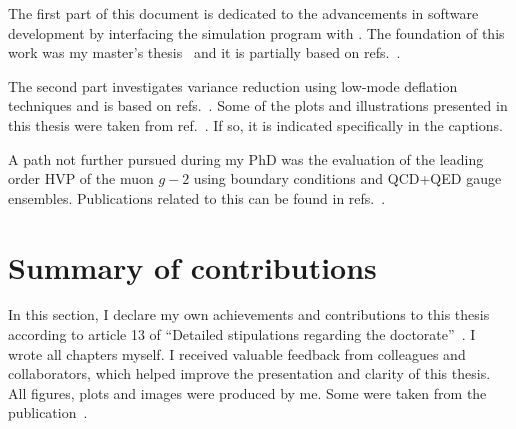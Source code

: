 The first part of this document is dedicated to the advancements in software development by interfacing the simulation program \openqxd with \quda.
The foundation of this work was my master's thesis~ and it is partially based on refs.~.

The second part investigates variance reduction using low-mode deflation techniques and is based on refs.~.
Some of the plots and illustrations presented in this thesis were taken from ref.~.
If so, it is indicated specifically in the captions.

A path not further pursued during my PhD was the evaluation of the leading order HVP of the muon $g-2$ using \Cstar boundary conditions and QCD+QED gauge ensembles.
Publications related to this can be found in refs.~.



\section{Summary of contributions}

In this section, I declare my own achievements and contributions to this thesis according to article \num{13} of ``Detailed stipulations regarding the doctorate''~\cite{eth:doctorate:stipulations}.
I wrote all chapters myself.
I received valuable feedback from colleagues and collaborators, which helped improve the presentation and clarity of this thesis.
All figures, plots and images were produced by me.
Some were taken from the publication~\cite{mglma}.

